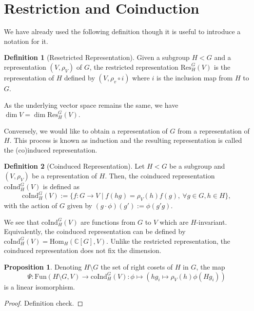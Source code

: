 \documentclass[]{article}
\theoremstyle{definition}
\theoremstyle{definition}
\newtheorem{definition}{Definition}[section]
\newtheorem{proposition}{Proposition}[section]
\begin{document}
\newpage
\section{Restriction and Coinduction}

We have already used the following definition though it is useful to introduce 
a notation for it. 

\begin{definition}[Resetricted Representation]
  Given a subgroup \(H < G\) and a representation \((V, \rho_V)\) of \(G\), 
  the restricted representation \(\text{Res}_H^G(V)\) is the representation 
  of \(H\) defined by \((V, \rho_v \circ i)\) where \(i\) is the inclusion map 
  from \(H\) to \(G\).
\end{definition}

As the underlying vector space remains the same, we have 
\(\dim V = \dim \text{Res}_H^G(V)\).

Conversely, we would like to obtain a representation of \(G\) from a 
representation of \(H\). This process is known as induction and the resulting 
representation is called the (co)induced representation.

\begin{definition}[Coinduced Representation]
  Let \(H < G\) be a subgroup and \((V, \rho_V)\) be a representation of \(H\). 
  Then, the coinduced representation \(\text{coInd}_H^G(V)\) is defined as 
  \[\text{coInd}_H^G(V) := \{f : G \to V \mid f(hg) = \rho_V(h)f(g), \ 
    \forall g \in G, h \in H\},\]
  with the action of \(G\) given by \((g \cdot \phi)(g') := \phi(g'g)\).
\end{definition}

We see that \(\text{coInd}_H^G(V)\) are functions from \(G\) to \(V\) which are 
\(H\)-invariant. Equivalently, the coinduced representation can be defined 
by \(\text{coInd}_H^G(V) = \text{Hom}_H(\mathbb{C}[G], V)\). Unlike the 
restricted representation, the coinduced representation does not fix the 
dimension.

\begin{proposition}
  Denoting \(H \setminus G\) the set of right cosets of \(H\) in \(G\), the map 
  \[\Psi : \text{Fun}(H \setminus G, V) \to \text{coInd}_H^G(V) : 
    \phi \mapsto (hg_i \mapsto \rho_V(h)\phi(Hg_i))\]
  is a linear isomorphism.
\end{proposition}
\begin{proof}
  Definition check.
\end{proof}
\end{document}
